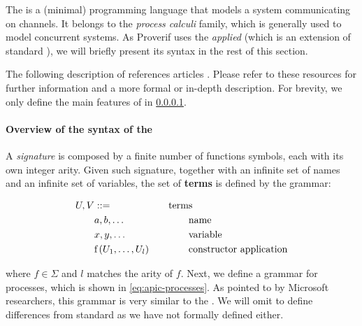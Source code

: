 The \pic{} \cite{pi-calculus-book} is a (minimal) programming language that models a system communicating on channels. It belongs to the \textit{process calculi} family, which is generally used to model concurrent systems. As Proverif uses the \textit{applied} \pic{} (which is an extension of standard \pic{}{}), we will briefly present its syntax in the rest of this section.

The following description of \apic{} references articles \cite{applied-pi-calculus-private-auth, applied-pi-calculus-abadi-1, applied-pi-calculus-abadi-2}. Please refer to these resources for further information and a more formal or in-depth description. For brevity, we only define the main features of \apic{} in \cref{subsub:syntax-apic}.

\paragraph{Overview of the syntax of the \apic{}}
\label{subsub:syntax-apic}

A \textit{signature \textSigma} is composed by a finite number of functions symbols, each with its own integer arity. Given such signature, together with an infinite set of names and an infinite set of variables, the set of \textbf{terms} is defined by the grammar:

\begin{equation}
    \label{eq:apic-terms}
    \begin{aligned}
        U, V & ::=                        \\
             & a, b, \ldots               \\
             & x, y, \ldots               \\
             & \mbox{f}\left(U_1, \ldots, U_l\right)
    \end{aligned}
    \qquad
    \begin{aligned}
        \mbox{term} & \mbox{s}                       \\
                    & \mbox{name}                    \\
                    & \mbox{variable}                \\
                    & \mbox{constructor application}
    \end{aligned}
\end{equation}

where $f \in \Sigma$ and $l$ matches the arity of $f$. Next, we define a grammar for processes, which is shown in \cref{eq:apic-processes}. As pointed to by Microsoft researchers, this grammar is very similar to the \pic{} \cite{applied-pi-calculus-private-auth}. We will omit to define differences from standard \pic{} as we have not formally defined \pic{} either.

